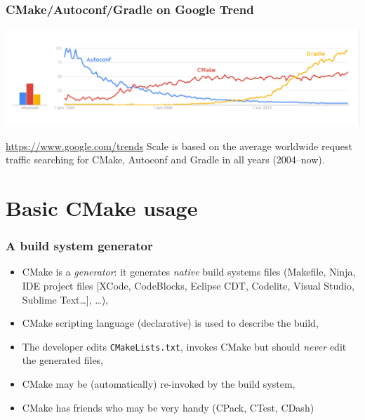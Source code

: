 \documentclass[compress,slidestop,table
              ]
               {beamer}
\newcommand{\fname}[1]{\texttt{#1}}
\begin{document}
\begin{frame}
\frametitle{CMake/Autoconf/Gradle on Google Trend}
\begin{center}
\includegraphics[width=1.0\textwidth,height=0.50\textheight]{CMakeAutoconfGradle-trend-2016}
\end{center}
\begin{block}{\url{https://www.google.com/trends}}
Scale is based on the average worldwide request traffic searching for CMake, Autoconf and Gradle in all years (2004--now).
\end{block}
\end{frame}

\section{Basic CMake usage}

\begin{frame}
\frametitle{A build system generator}
\begin{itemize}
\item CMake is a \emph{generator}: it generates \emph{native} build systems files (Makefile, Ninja, IDE project files [XCode, CodeBlocks, Eclipse CDT, Codelite, Visual Studio, Sublime Text\ldots], \ldots),
\item CMake scripting language (declarative) is used to describe the build,
\item The developer edits \fname{CMakeLists.txt}, invokes CMake but
      should \emph{never} edit the generated files,
\item CMake may be (automatically) re-invoked by the build system,
\item CMake has friends who may be very handy (CPack, CTest, CDash)
\end{itemize}
\end{frame}
\end{document}
